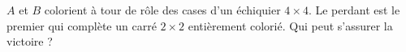 $A$ et $B$ colorient à tour de rôle des cases d'un échiquier $4 \times 4$. Le perdant est le premier qui complète un carré $2 \times 2$ entièrement colorié. Qui peut s'assurer la victoire ?
